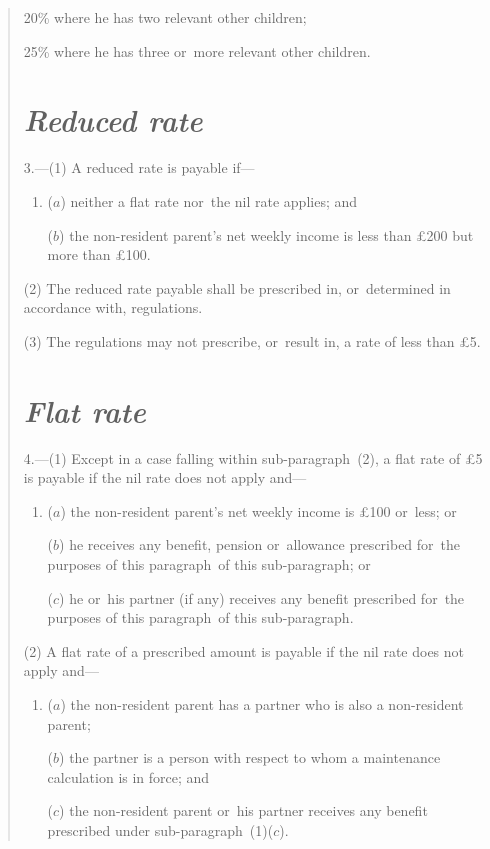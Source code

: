 \documentclass[12pt,a4paper]{article}
\begin{document}
\begin{quotation}
\begin{enumerate}
    20\% where he has two relevant other children;

    25\% where he has three or~more relevant other children. 
\end{enumerate}

\section*{\itshape Reduced rate}

3.---(1) A reduced rate is payable if—
\begin{enumerate}\item[]
($a$) neither a flat rate nor~the nil rate applies; and

($b$) the non-resident parent’s net weekly income is less than £200 but more than £100. 
\end{enumerate}

(2) The reduced rate payable shall be prescribed in, or~determined in accordance with, regulations.

(3) The regulations may not prescribe, or~result in, a rate of less than £5. 

\section*{\itshape Flat rate}

4.---(1) Except in a case falling within sub-paragraph~(2), a flat rate of £5 is payable if the nil rate does not apply and—
\begin{enumerate}\item[]
($a$) the non-resident parent’s net weekly income is £100 or~less; or

($b$) he receives any benefit, pension or~allowance prescribed for~the purposes of this paragraph~of this sub-paragraph; or

($c$) he or~his partner (if any) receives any benefit prescribed for~the purposes of this paragraph~of this sub-paragraph.
\end{enumerate}

(2) A flat rate of a prescribed amount is payable if the nil rate does not apply and—
\begin{enumerate}\item[]
($a$) the non-resident parent has a partner who is also a non-resident parent;

($b$) the partner is a person with respect to whom a maintenance calculation is in force; and

($c$) the non-resident parent or~his partner receives any benefit prescribed under sub-paragraph~(1)($c$).
\end{enumerate}


\end{quotation}
\end{document}

